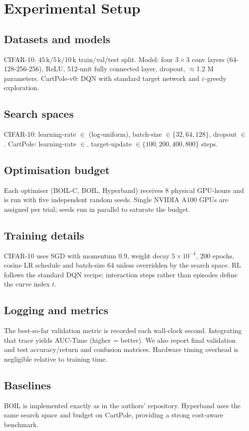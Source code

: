 \documentclass{article} %
\begin{document}
\section{Experimental Setup}
\label{sec:experimental}
\subsection{Datasets and models}
CIFAR-10: \(45\,\text{k}/5\,\text{k}/10\,\text{k}\) train/val/test split. Model: four \(3\times 3\) conv layers (64-128-256-256), ReLU, 512-unit fully connected layer, dropout, \(\approx\)1.2 M parameters. CartPole-v0: DQN with standard target network and \(\varepsilon\)-greedy exploration.

\subsection{Search spaces}
CIFAR-10: learning-rate \(\in\) (log-uniform), batch-size \(\in\{32,64,128\}\), dropout \(\in\). CartPole: learning-rate \(\in\), target-update \(\in\{100,200,400,800\}\) steps.

\subsection{Optimisation budget}
Each optimiser (BOIL-C, BOIL, Hyperband) receives 8 physical GPU-hours and is run with five independent random seeds. Single NVIDIA A100 GPUs are assigned per trial; seeds run in parallel to saturate the budget.

\subsection{Training details}
CIFAR-10 uses SGD with momentum 0.9, weight decay \(5\times 10^{-4}\), 200 epochs, cosine LR schedule and batch-size 64 unless overridden by the search space. RL follows the standard DQN recipe; interaction steps rather than episodes define the curve index \(t\).

\subsection{Logging and metrics}
The best-so-far validation metric is recorded each wall-clock second. Integrating that trace yields AUC-Time (higher = better). We also report final validation and test accuracy/return and confusion matrices. Hardware timing overhead is negligible relative to training time.

\subsection{Baselines}
BOIL is implemented exactly as in the authors' repository. Hyperband uses the same search space and budget on CartPole, providing a strong cost-aware benchmark.
\end{document}
